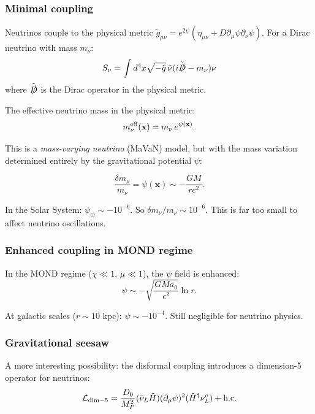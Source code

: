 \documentclass[11pt,a4paper]{article}
\begin{document}
\subsubsection{Minimal coupling}

Neutrinos couple to the physical metric $\tilde{g}_{\mu\nu} = e^{2\psi}(\eta_{\mu\nu} + D\partial_\mu\psi\partial_\nu\psi)$. For a Dirac neutrino with mass $m_\nu$:
\begin{equation}
S_\nu = \int d^4x\sqrt{-\tilde{g}}\,\bar\nu(i\tilde{\slashed{D}} - m_\nu)\nu
\end{equation}
where $\tilde{\slashed{D}}$ is the Dirac operator in the physical metric.

The effective neutrino mass in the physical metric:
\begin{equation}
m_\nu^{\rm eff}(\mathbf{x}) = m_\nu\,e^{\psi(\mathbf{x})}.
\end{equation}

This is a \emph{mass-varying neutrino} (MaVaN) model, but with the mass variation determined entirely by the gravitational potential $\psi$:

\begin{equation}
\frac{\delta m_\nu}{m_\nu} = \psi(\mathbf{x}) \sim -\frac{GM}{rc^2}.
\end{equation}

In the Solar System: $\psi_\odot \sim -10^{-6}$. So $\delta m_\nu/m_\nu \sim 10^{-6}$. This is far too small to affect neutrino oscillations.

\subsubsection{Enhanced coupling in MOND regime}

In the MOND regime ($\chi \ll 1$, $\mu \ll 1$), the $\psi$ field is enhanced:
\begin{equation}
\psi \sim -\sqrt{\frac{GM a_0}{c^2}}\ln r.
\end{equation}

At galactic scales ($r \sim 10$ kpc): $\psi \sim -10^{-4}$. Still negligible for neutrino physics.

\subsubsection{Gravitational seesaw}

A more interesting possibility: the disformal coupling introduces a dimension-5 operator for neutrinos:
\begin{equation}
\mathcal{L}_{\rm dim-5} = \frac{D_0}{M_P^2}(\bar\nu_L \tilde{H})(\partial_\mu\psi)^2(\tilde{H}^\dagger \nu_L^c) + \text{h.c.}
\end{equation}
\end{document}
